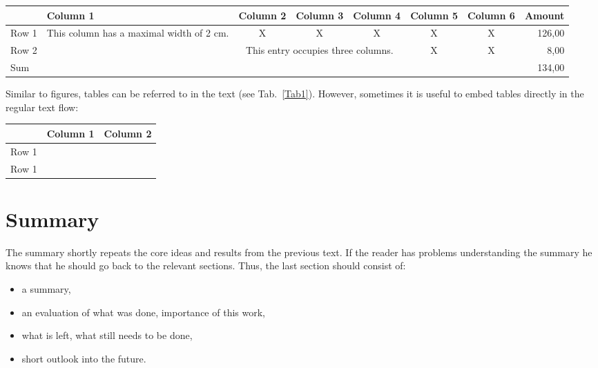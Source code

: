 \documentclass[twocolumn]{article}
\begin{document}
\begin{table*}
\label{Tab1}
\begin{center}
\begin{tabular}{|l|p{2cm}|c|c|c|c|c|r|}
\hline
	& Column 1 & Column 2 & Column 3 & Column 4& Column 5& Column 6& Amount\\
\hline
Row 1 & This column has a maximal width of 2 cm.& X & X& X& X& X& 126,00\\
\hline
Row 2 & & \multicolumn{3}{p{5cm}|}{This entry occupies three columns.}& X &X & 8,00\\
\hline
\multicolumn{7}{|l}{Sum} &134,00\\
\hline
\end{tabular}
\caption{For this layout, we want table captions to be {\em below} the actual table.}
\end{center}
\end{table*}

Similar to figures, tables can be referred to in the text (see Tab.~\ref{Tab1}).
However, sometimes it is useful to embed tables directly in the regular
text flow:

\begin{center}
\begin{tabular}{|c|c|c|}
\hline
	& Column 1 & Column 2 \\
\hline
Row 1 & & \\
Row 1 & & \\
\hline
\end{tabular}
\end{center}


\section{Summary}
\label{summary}

The summary shortly repeats the core ideas and results from the
previous text. If the reader has problems understanding the summary
he knows that he should go back to the relevant sections.
Thus, the last section should consist of:

\begin{itemize}
	\item a summary,
	\item an evaluation of what was done, importance of this work,
	\item what is left, what still needs to be done,
        \item short outlook into the future.
\end{itemize}
\end{document}
